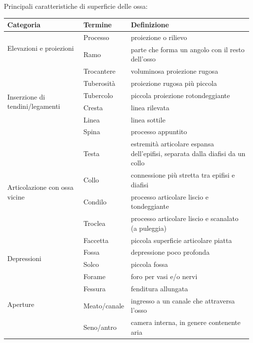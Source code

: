 Principali caratteristiche di superficie delle ossa:
\begin{table}[htbp]
  \centering \small \renewcommand{\arraystretch}{1.2}
  \begin{tabularx}{\textwidth}{|l|l|X|}
    \hline
    \textbf{Categoria} & \textbf{Termine} & \textbf{Definizione} \\
    \hline
    \multirow{2}{*}{Elevazioni e proiezioni}
      & Processo & proiezione o rilievo \\
      & Ramo & parte che forma un angolo con il resto dell'osso \\
    \hline
    \multirow{6}{*}{Inserzione di tendini/legamenti}
      & Trocantere & voluminosa proiezione rugosa \\
      & Tuberosità & proiezione rugosa più piccola \\
      & Tubercolo & piccola proiezione rotondeggiante \\
      & Cresta & linea rilevata \\
      & Linea & linea sottile \\
      & Spina & processo appuntito \\
    \hline
    \multirow{5}{*}{Articolazione con ossa vicine}
      & Testa & estremità articolare espansa dell'epifisi, separata dalla diafisi da un collo \\
      & Collo & connessione più stretta tra epifisi e diafisi \\
      & Condilo & processo articolare liscio e tondeggiante \\
      & Troclea & processo articolare liscio e scanalato (a puleggia) \\
      & Faccetta & piccola superficie articolare piatta \\
    \hline
    \multirow{2}{*}{Depressioni}
      & Fossa & depressione poco profonda \\
      & Solco & piccola fossa \\
    \hline
    \multirow{4}{*}{Aperture}
      & Forame & foro per vasi e/o nervi \\
      & Fessura & fenditura allungata \\
      & Meato/canale & ingresso a un canale che attraversa l'osso \\
      & Seno/antro & camera interna, in genere contenente aria \\
    \hline
  \end{tabularx}
\end{table}

